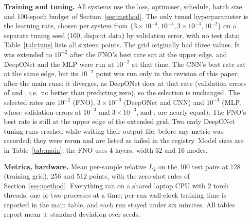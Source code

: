 \textbf{Training and tuning.} All systems use the loss, optimiser, schedule, batch size and 100-epoch budget of Section~\ref{sec:method}. The only tuned hyperparameter is the learning rate, chosen per system from $\{3\!\times\!10^{-4},10^{-3},3\!\times\!10^{-3},10^{-2}\}$ on a separate tuning seed (100, disjoint data) by validation error, with no test data; Table~\ref{tab:tune} lists all sixteen points. The grid originally had three values. It was extended to $10^{-2}$ after the FNO's best rate sat at the upper edge, and DeepONet and the MLP were run at $10^{-2}$ at that time. The CNN's best rate sat at the same edge, but its $10^{-2}$ point was run only in the revision of this paper, after the main runs; it diverges, as DeepONet does at that rate (validation errors of  and , i.e.\ no better than predicting zero), so the selection is unchanged. The selected rates are $10^{-2}$ (FNO), $3\times10^{-3}$ (DeepONet and CNN) and $10^{-3}$ (MLP, whose validation errors at $10^{-3}$ and $3\times10^{-3}$,  and , are nearly equal). The FNO's best rate is still at the upper edge of the extended grid. Two early DeepONet tuning runs crashed while writing their output file, before any metric was recorded; they were rerun and are listed as failed in the registry. Model sizes are in Table~\ref{tab:main}; the FNO uses 4 layers, width 32 and 16 modes.

\begin{table}[t]\centering\caption{Learning-rate tuning: validation relative $L_2$ at 128 points on the tuning seed (one run per cell, 100 epochs); bold marks the selected rate.}\label{tab:tune}
\end{table}

\textbf{Metrics, hardware.} Mean per-sample relative $L_2$ on the 100 test pairs at 128 (training grid), 256 and 512 points, with the zero-shot rules of Section~\ref{sec:method}. Everything ran on a shared laptop CPU with 2 torch threads, one or two processes at a time; per-run wall-clock training time is reported in the main table, and each run stayed under six minutes. All tables report mean $\pm$ standard deviation over seeds.
